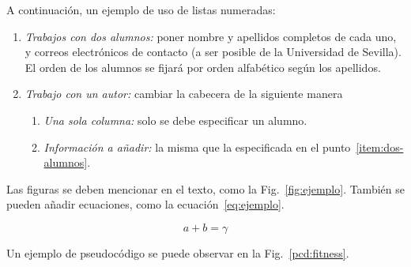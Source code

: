 \documentclass[conference,a4paper]{IEEEtran}
\def\figurename{Fig.}
\begin{document}
A continuación, un ejemplo de uso de listas numeradas:
\begin{enumerate}
\item\label{item:dos-alumnos} \textit{Trabajos con dos alumnos:} poner nombre y
  apellidos completos de cada uno, y correos electrónicos de contacto (a ser
  posible de la Universidad de Sevilla). El orden de los alumnos se fijará por
  orden alfabético según los apellidos.
\item \textit{Trabajo con un autor:} cambiar la cabecera de la siguiente manera
  \begin{enumerate}
  \item \textit{Una sola columna:} solo se debe especificar un alumno.
  \item \textit{Información a añadir:} la misma que la especificada en el
    punto~\ref{item:dos-alumnos}.
  \end{enumerate}
\end{enumerate}

Las figuras se deben mencionar en el texto, como la
\figurename~\ref{fig:ejemplo}. También se pueden añadir ecuaciones, como la
ecuación~\eqref{eq:ejemplo}.

\begin{equation}
  \label{eq:ejemplo}
  a + b = \gamma
\end{equation}

Un ejemplo de pseudocódigo se puede observar en la
\figurename~\ref{pcd:fitness}.
\end{document}
